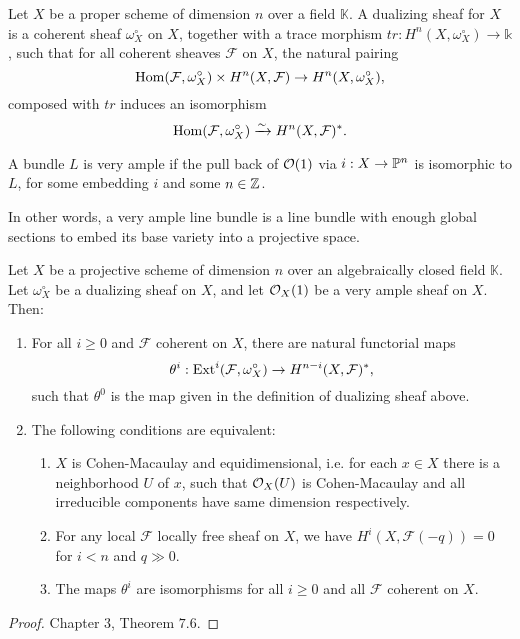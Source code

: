 \documentclass[
	oldfontcommands,
	sumario=abnt-6027-2012,
	12pt,			%
	openright,		%
	oneside,		%
	a4paper,		%
	english,		%
	brazil			%
	]{imecc-unicamp}
\begin{document}
\begin{definition}
	Let $X$ be a proper scheme of dimension $n$ over a field $\mathbb K$. A dualizing sheaf for $X$ is a coherent sheaf $\omega_X^\circ$ on $X$, together with a trace morphism $tr:H^n(X,\omega_X^\circ)\rightarrow \mathbb k$, such that for all coherent sheaves $\mathcal F$ on $X$, the natural pairing $$
	\operatorname{Hom}(\mathcal F,\omega_X^\circ)\times H^n(X,\mathcal F)\rightarrow H^n(X,\omega_X^\circ),
	$$
	composed with $tr$ induces an isomorphism $$
	\operatorname{Hom}(\mathcal F,\omega_X^\circ)\xrightarrow{\sim}H^n(X,\mathcal F)^*.
	$$
\end{definition}



\begin{definition}
	A bundle $L$ is very ample if the pull back of ${\mathcal O}(1)$ via $i:X\rightarrow {\mathbb P}^n$ is isomorphic to $L$, for some embedding $i$ and some $n\in{\mathbb Z}$.
\end{definition}

In other words, a very ample line bundle is a line bundle with enough global sections to embed its base variety into a projective space.

\begin{teorema} Let $X$ be a projective scheme of dimension $n$ over an algebraically closed field $\mathbb K$. Let $\omega_X^\circ$ be a dualizing sheaf on $X$, and let ${\mathcal O}_X(1)$ be a very ample sheaf on $X$. Then:
	\begin{enumerate}
		\item For all $i\geq 0$ and $\mathcal F$ coherent on $X$, there are natural functorial maps $$
		\theta^i:\operatorname{Ext}^i(\mathcal F, \omega_X^\circ)\rightarrow H^{n-i}(X,\mathcal F)^*,
		$$	
		such that $\theta^0$ is the map given in the definition of dualizing sheaf above. 
		\item The following conditions are equivalent:
		\begin{enumerate}
			\item $X$ is Cohen-Macaulay and equidimensional, i.e. for each $x\in X$ there is a neighborhood $U$ of $x$, such that ${\mathcal O}_X(U)$ is Cohen-Macaulay and all irreducible components have same dimension respectively.
			\item For any local $\mathcal F$ locally free sheaf on $X$, we have $H^i(X,\mathcal F(-q))=0$ for $i<n$ and $q\gg0$.
			\item The maps $\theta^i$ are isomorphisms for all $i\geq 0$ and all $\mathcal F$ coherent on $X$.
		\end{enumerate}
	\end{enumerate}
\end{teorema}
\begin{proof}
	\cite{hartshorne1977algebraic} Chapter $3$, Theorem $7.6$.
\end{proof}
\end{document}

